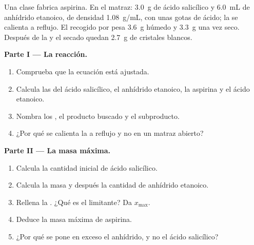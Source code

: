 \begin{problem}
\label{pb:g10:synthesis-yield:1}
Una clase fabrica aspirina. En el matraz: \qty{3.0}{g} de ácido
salicílico y \qty{6.0}{mL} de anhídrido etanoico, de densidad
\qty{1.08}{g/mL}, con unas gotas de ácido; la  se calienta a
reflujo. El  recogido por  pesa
\qty{3.6}{g} húmedo y \qty{3.3}{g} una vez seco. Después de la
 y el secado quedan \qty{2.7}{g} de cristales blancos.

\medskip
\noindent\textbf{Parte I --- La reacción.}
\begin{enumerate}
  \item Comprueba que la ecuación
         está ajustada.
  \item Calcula las  del ácido salicílico, el anhídrido
        etanoico, la aspirina y el ácido etanoico.
  \item Nombra los , el producto buscado y el subproducto.
  \item ¿Por qué se calienta la  a reflujo y no en un matraz
        abierto?
\end{enumerate}

\medskip
\noindent\textbf{Parte II --- La masa máxima.}
\begin{enumerate}[resume]
  \item Calcula la cantidad inicial de ácido salicílico.
  \item Calcula la masa y después la cantidad de anhídrido etanoico.
  \item Rellena la . ¿Qué  es el limitante? Da
        $x_{\max}$.
  \item Deduce la masa máxima de aspirina.
  \item ¿Por qué se pone en exceso el anhídrido, y no el ácido
        salicílico?
\end{enumerate}


\end{problem}
